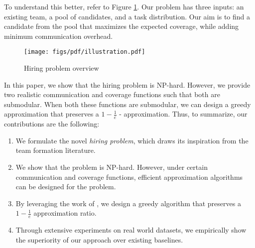 To understand this better, refer to Figure \ref{fig:hpo}.
Our problem has three inputs: an existing team, a pool of candidates, and a task distribution. 
Our aim is to find a candidate from the pool that maximizes the expected coverage, while adding minimum communication overhead. 
\begin{figure}
\centering
\begin{small}
\texttt{[image: figs/pdf/illustration.pdf]}
\caption{Hiring problem overview}
\label{fig:hpo}
\end{small}
\end{figure} 

In this paper, we show that the hiring problem is NP-hard.
However, we provide two realistic communication and coverage functions such that both are submodular.
When both these functions are submodular, we can design a greedy approximation \cite{bai2016algorithms} that preserves a $1 - \frac{1}{e}$ - approximation.
Thus, to summarize, our contributions are the following:

\begin{enumerate}
\item We formulate the novel \textit{hiring problem}, which draws its inspiration from the team formation literature.

\item We show that the problem is NP-hard. 
However, under certain communication and coverage functions, efficient approximation algorithms can be designed for the problem.

\item By leveraging the work of \cite{bai2016algorithms}, we design a greedy algorithm that preserves a $1 - \frac{1}{e}$ approximation ratio.

\item Through extensive experiments on real world datasets, we empirically show the superiority of our approach over existing baselines. 

\end{enumerate}